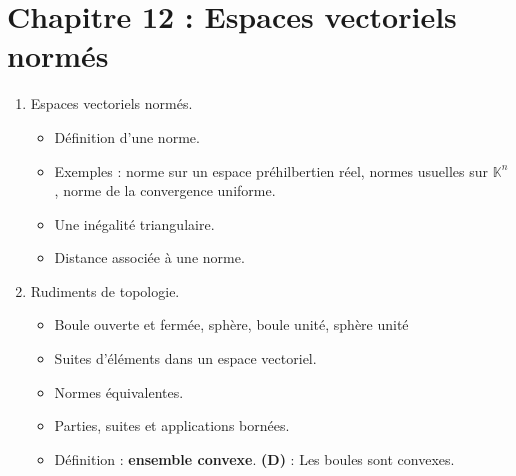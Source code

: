 \documentclass[twoside,a4paper,french,10pt]{VcCours}
\begin{document}
\section*{Chapitre 12 : Espaces vectoriels normés}
    \begin{enumerate}
    \item Espaces vectoriels normés.
    \begin{itemize}
    \item Définition d'une norme.
    \item Exemples : norme sur un espace préhilbertien réel, normes usuelles sur $\mathbb{K}^n$, norme de la convergence uniforme.
    \item Une inégalité triangulaire.
    \item Distance associée à une norme. 
    \end{itemize}
    \item Rudiments de topologie.
    \begin{itemize}
    \item Boule ouverte et fermée, sphère, boule unité, sphère unité
    \item Suites d'éléments dans un espace vectoriel.
    \item Normes équivalentes.
    \item Parties, suites et applications bornées.
    \item Définition : \textbf{ensemble convexe}. \textbf{(D)} : Les boules sont convexes. 
    \end{itemize}

\end{enumerate}
\end{document}
